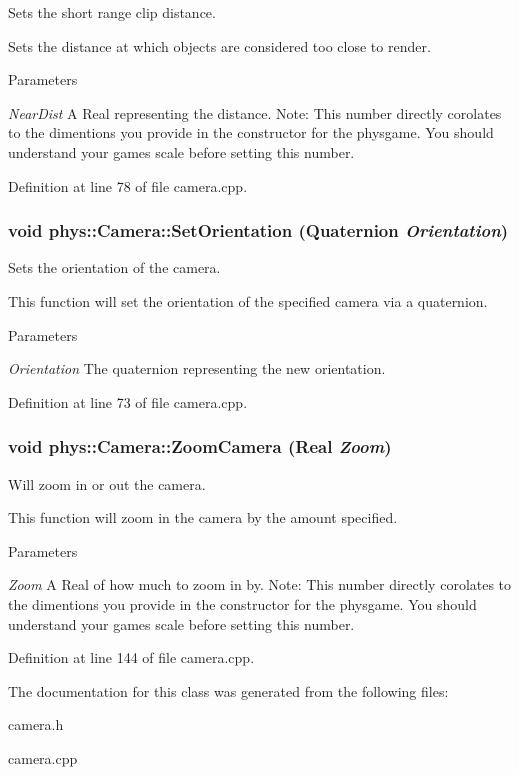 Sets the short range clip distance. 

Sets the distance at which objects are considered too close to render. 
\begin{DoxyParams}{Parameters}
\item[{\em NearDist}]A Real representing the distance. Note: This number directly corolates to the dimentions you provide in the constructor for the physgame. You should understand your games scale before setting this number. \end{DoxyParams}


Definition at line 78 of file camera.cpp.

\hypertarget{classphys_1_1Camera_af0822410414622c2a3c8b4da207b53ab}{
\subsubsection[{SetOrientation}]{\setlength{\rightskip}{0pt plus 5cm}void phys::Camera::SetOrientation ({\bf Quaternion} {\em Orientation})}}
\label{d9/df8/classphys_1_1Camera_af0822410414622c2a3c8b4da207b53ab}


Sets the orientation of the camera. 

This function will set the orientation of the specified camera via a quaternion. 
\begin{DoxyParams}{Parameters}
\item[{\em Orientation}]The quaternion representing the new orientation. \end{DoxyParams}


Definition at line 73 of file camera.cpp.

\hypertarget{classphys_1_1Camera_a1cb593d12be4e6e1e51cb8f74ce2d97c}{
\subsubsection[{ZoomCamera}]{\setlength{\rightskip}{0pt plus 5cm}void phys::Camera::ZoomCamera ({\bf Real} {\em Zoom})}}
\label{d9/df8/classphys_1_1Camera_a1cb593d12be4e6e1e51cb8f74ce2d97c}


Will zoom in or out the camera. 

This function will zoom in the camera by the amount specified. 
\begin{DoxyParams}{Parameters}
\item[{\em Zoom}]A Real of how much to zoom in by. Note: This number directly corolates to the dimentions you provide in the constructor for the physgame. You should understand your games scale before setting this number. \end{DoxyParams}


Definition at line 144 of file camera.cpp.



The documentation for this class was generated from the following files:\begin{DoxyCompactItemize}
\item 
camera.h\item 
camera.cpp\end{DoxyCompactItemize}
